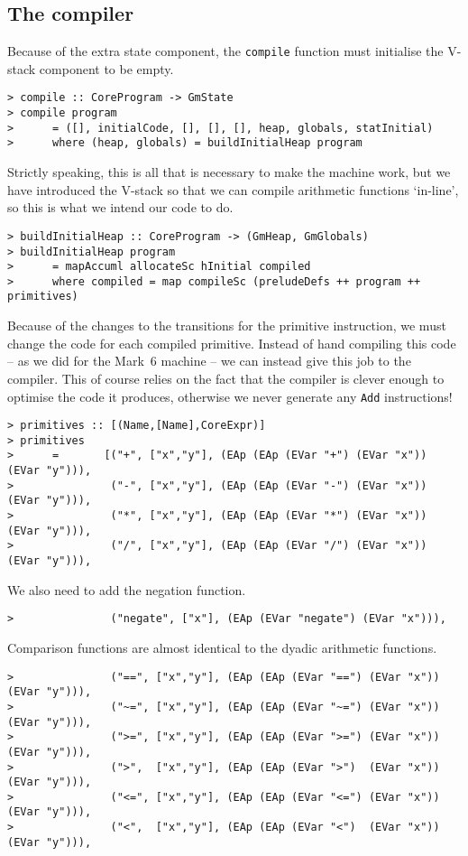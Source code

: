 \subsection{The compiler}

Because of the extra state component, the \mbox{\tt compile} function must
initialise the V-stack component to be empty.
\begin{verbatim}
> compile :: CoreProgram -> GmState
> compile program
>      = ([], initialCode, [], [], [], heap, globals, statInitial)
>      where (heap, globals) = buildInitialHeap program
\end{verbatim}
%
%
Strictly speaking, this is all that is necessary to make the machine
work, but we have introduced the V-stack so that we can compile
arithmetic functions `in-line', so this is what we intend our code
to do.
\begin{verbatim}
> buildInitialHeap :: CoreProgram -> (GmHeap, GmGlobals)
> buildInitialHeap program
>      = mapAccuml allocateSc hInitial compiled
>      where compiled = map compileSc (preludeDefs ++ program ++ primitives)
\end{verbatim}
%
%
\par
Because of the changes to the transitions for the primitive
instruction, we must change the code for each compiled primitive.
Instead of hand compiling this code -- as we did for the Mark~6
machine -- we can instead give this job to the compiler. This of
course relies on the fact that the compiler is clever enough to
optimise the code it produces, otherwise we never generate any \mbox{\tt Add}
instructions!
\begin{verbatim}
> primitives :: [(Name,[Name],CoreExpr)]
> primitives
>      =       [("+", ["x","y"], (EAp (EAp (EVar "+") (EVar "x")) (EVar "y"))),
>               ("-", ["x","y"], (EAp (EAp (EVar "-") (EVar "x")) (EVar "y"))),
>               ("*", ["x","y"], (EAp (EAp (EVar "*") (EVar "x")) (EVar "y"))),
>               ("/", ["x","y"], (EAp (EAp (EVar "/") (EVar "x")) (EVar "y"))),
\end{verbatim}
%
We also need to add the negation function.
\begin{verbatim}
>               ("negate", ["x"], (EAp (EVar "negate") (EVar "x"))),
\end{verbatim}
Comparison functions are almost identical to the dyadic arithmetic
functions.
\begin{verbatim}
>               ("==", ["x","y"], (EAp (EAp (EVar "==") (EVar "x")) (EVar "y"))),
>               ("~=", ["x","y"], (EAp (EAp (EVar "~=") (EVar "x")) (EVar "y"))),
>               (">=", ["x","y"], (EAp (EAp (EVar ">=") (EVar "x")) (EVar "y"))),
>               (">",  ["x","y"], (EAp (EAp (EVar ">")  (EVar "x")) (EVar "y"))),
>               ("<=", ["x","y"], (EAp (EAp (EVar "<=") (EVar "x")) (EVar "y"))),
>               ("<",  ["x","y"], (EAp (EAp (EVar "<")  (EVar "x")) (EVar "y"))),
\end{verbatim}
